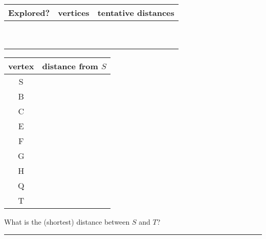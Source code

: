 \documentclass[12pt]{article}
\newcommand{\ans}[1][1in]{\rule{#1}{.5pt}}
\begin{document}
\begin{enumerate}
\begin{adjustbox}{valign=t,minipage={.25\textwidth}}
\begin{tabular}{ c | c | p{2in}}
Explored? & vertices & tentative distances\\ \hline
& \\
& \\
& \\& \\& \\& \\& \\& \\& \\%
 \end{tabular}


\end{adjustbox}

\begin{adjustbox}{valign=t,minipage={.25\textwidth}}
{
 \begin{tabular}{c | p{2in}}
vertex &  distance from $S$\\
\hline
S & \\ 
B & \\
C & \\ E & \\ F & \\ G & \\ H & \\ Q & \\ T & \\
\end{tabular}
}
\end{adjustbox}

\bigskip

What is the (shortest) distance between $S$ and $T$? \ans

\end{enumerate}
\end{document}
